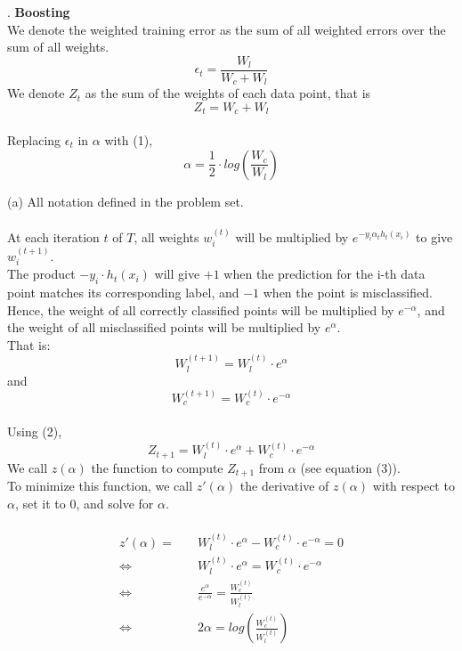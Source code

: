 \documentclass{article}
\begin{document}
. \textbf{Boosting}\\

\noindent
We denote the weighted training error as the sum of all weighted errors over the sum of all weights.
\begin{equation}
	\epsilon_t = \frac{W_l}{W_c + W_l}
\end{equation}
We denote $Z_t$ as the sum of the weights of each data point, that is
\begin{equation}
	Z_t = W_c + W_l
\end{equation}\\
Replacing $\epsilon_t$ in $\alpha$ with (1), 
\begin{equation}
	\alpha = \frac{1}{2} \cdot log\left(\frac{W_c}{W_l}\right)
\end{equation}

(a) All notation defined in the problem set.\\
\\
At each iteration $t$ of $T$, all weights $w_i^{(t)}$ will be multiplied by $e^{-y_i\alpha_th_t(x_i)}$ to give $w_i^{(t+1)}$.\\
The product $-y_i\cdot h_t(x_i)$ will give $+1$ when the prediction for the i-th data point matches its corresponding label, and $-1$ when the point is misclassified.\\
Hence, the weight of all correctly classified points will be multiplied by $e^{-\alpha}$, and the weight of all misclassified points will be multiplied by $e^{\alpha}$.\\
That is:
$$W_l^{(t+1)} = W_l^{(t)} \cdot e^{\alpha}$$
and 
$$W_c^{(t+1)} = W_c^{(t)} \cdot e^{-\alpha}$$
\\
Using (2), 
\begin{equation}
	Z_{t+1} = W_l^{(t)} \cdot e^{\alpha} + W_c^{(t)} \cdot e^{-\alpha}
\end{equation}
We call $z(\alpha)$ the function to compute $Z_{t+1}$ from $\alpha$ (see equation (3)).\\

To minimize this function, we call $z'(\alpha)$ the derivative of $z(\alpha)$ with respect to $\alpha$, set it to $0$, and solve for $\alpha$.\\
\\

\begin{align*}
	z'(\alpha) = & \quad W_l^{(t)} \cdot e^\alpha - W_c^{(t)} \cdot e^{-\alpha}  = 0 \\
	\Longleftrightarrow & \quad W_l^{(t)} \cdot e^\alpha = W_c^{(t)} \cdot e^{-\alpha} \\
	\Longleftrightarrow & \quad \frac{e^\alpha}{e^{-\alpha}} = \frac{W_c^{(t)}}{W_l^{(t)}}\\
	\Longleftrightarrow & \quad 2\alpha = log\left(\frac{W_c^{(t)}}{W_l^{(t)}}\right)\\
\end{align*}
\end{document}
